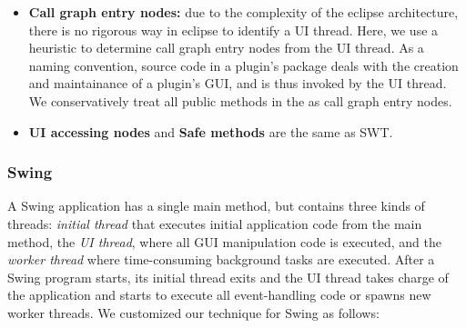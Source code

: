 \begin{itemize}

\item \textbf{Call graph entry nodes: } due to the complexity of the eclipse architecture,
there is no rigorous way in eclipse to identify a UI thread. Here, we use a heuristic to determine call graph
entry nodes from the UI thread. As a naming convention, source code in a plugin's 
package deals with the creation and maintainance of a plugin's GUI, and is thus
invoked by the UI thread. We conservatively treat all public methods in the 
as call graph entry nodes.


\item \textbf{UI accessing nodes} and \textbf{Safe methods} are the same as SWT.

\end{itemize}

\subsubsection{Swing}



A Swing application has a single main method, but contains three kinds of
threads: \textit{initial thread} that executes initial application code from the main method,
the \textit{UI thread}, where all GUI manipulation code is executed,
and the \textit{worker thread} where time-consuming background tasks are executed.
After a Swing program starts, its initial thread exits and the UI thread takes charge
of the application and starts to execute all event-handling code or spawns new worker threads. 
We customized our technique for Swing as follows:

